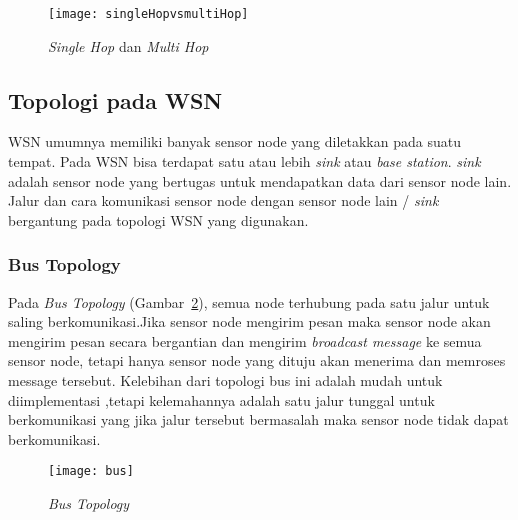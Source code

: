 \begin{figure} [H]
	\centering  
	\texttt{[image: singleHopvsmultiHop]}  
	\caption[{\it Single Hop} dan {\it Multi Hop}]{{\it Single Hop} dan {\it Multi Hop}} 
	\label{fig:singleHopvsmultiHop} 
\end{figure} 

\subsection{Topologi pada WSN \cite{topologi:0:topologiWSN}}
\label{subsec:topologiWSN}
WSN umumnya memiliki banyak sensor node yang diletakkan pada suatu tempat. Pada WSN bisa terdapat satu atau lebih {\it sink} atau {\it base station}. {\it sink} adalah sensor node yang bertugas untuk mendapatkan data dari sensor node lain. Jalur dan cara komunikasi sensor node dengan sensor node lain / {\it sink} bergantung pada topologi WSN yang digunakan.

\subsubsection{Bus Topology}
Pada {\it Bus Topology} (Gambar~\ref{fig:bus}), semua node terhubung pada satu jalur untuk saling berkomunikasi.Jika sensor node mengirim pesan maka sensor node akan mengirim pesan secara bergantian dan mengirim {\it broadcast message} ke semua sensor node, tetapi hanya sensor node yang dituju akan menerima dan memroses message tersebut. Kelebihan dari topologi bus ini adalah mudah untuk diimplementasi ,tetapi kelemahannya adalah satu jalur tunggal untuk berkomunikasi yang jika jalur tersebut bermasalah maka sensor node tidak dapat berkomunikasi.
\begin{figure} [H]
	\centering  
	\texttt{[image: bus]}  
	\caption[{\it Bus Topology}]{{\it Bus Topology}} 
	\label{fig:bus} 
\end{figure} 

